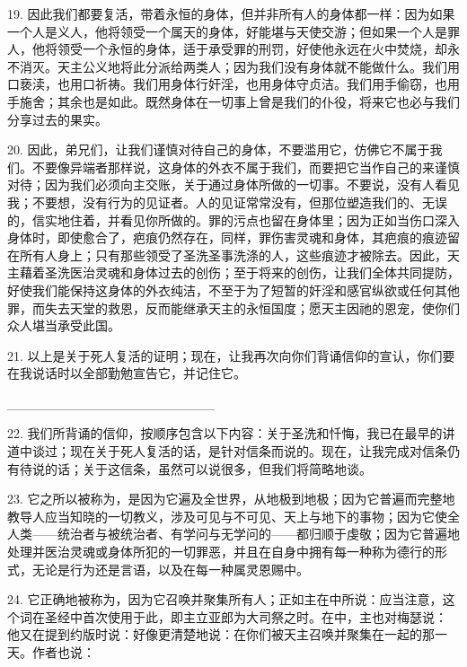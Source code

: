 19. 因此我们都要复活，带着永恒的身体，但并非所有人的身体都一样：因为如果一个人是义人，他将领受一个属天的身体，好能堪与天使交游；但如果一个人是罪人，他将领受一个永恒的身体，适于承受罪的刑罚，好使他永远在火中焚烧，却永不消灭。天主公义地将此分派给两类人；因为我们没有身体就不能做什么。我们用口亵渎，也用口祈祷。我们用身体行奸淫，也用身体守贞洁。我们用手偷窃，也用手施舍；其余也是如此。既然身体在一切事上曾是我们的仆役，将来它也必与我们分享过去的果实。\par

20. 因此，弟兄们，让我们谨慎对待自己的身体，不要滥用它，仿佛它不属于我们。不要像异端者那样说，这身体的外衣不属于我们，而要把它当作自己的来谨慎对待；因为我们必须向主交账，关于通过身体所做的一切事。不要说，没有人看见我；不要想，没有行为的见证者。人的见证常常没有，但那位塑造我们的、无误的，信实地住着，并看见你所做的。罪的污点也留在身体里；因为正如当伤口深入身体时，即使愈合了，疤痕仍然存在，同样，罪伤害灵魂和身体，其疤痕的痕迹留在所有人身上；只有那些领受了圣洗圣事洗涤的人，这些痕迹才被除去。因此，天主藉着圣洗医治灵魂和身体过去的创伤；至于将来的创伤，让我们全体共同提防，好使我们能保持这身体的外衣纯洁，不至于为了短暂的奸淫和感官纵欲或任何其他罪，而失去天堂的救恩，反而能继承天主的永恒国度；愿天主因祂的恩宠，使你们众人堪当承受此国。\par

21. 以上是关于死人复活的证明；现在，让我再次向你们背诵信仰的宣认，你们要在我说话时以全部勤勉宣告它，并记住它。\par

\_\_\_\_\_\_\_\_\_\_\_\_\_\_\_\_\_\_\_\_\_\_\par

22. 我们所背诵的信仰，按顺序包含以下内容：关于圣洗和忏悔，我已在最早的讲道中谈过；现在关于死人复活的话，是针对信条而说的。现在，让我完成对信条仍有待说的话；关于这信条，虽然可以说很多，但我们将简略地谈。\par

23. 它之所以被称为，是因为它遍及全世界，从地极到地极；因为它普遍而完整地教导人应当知晓的一切教义，涉及可见与不可见、天上与地下的事物；因为它使全人类——统治者与被统治者、有学问与无学问的——都归顺于虔敬；因为它普遍地处理并医治灵魂或身体所犯的一切罪恶，并且在自身中拥有每一种称为德行的形式，无论是行为还是言语，以及在每一种属灵恩赐中。\par

24. 它正确地被称为，因为它召唤并聚集所有人；正如主在中所说：应当注意，这个词在圣经中首次使用于此，即主立亚郎为大司祭之时。在中，主也对梅瑟说： 他又在提到约版时说：好像更清楚地说：在你们被天主召唤并聚集在一起的那一天。作者也说：\par

